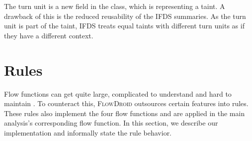 \documentclass[../draft.tex]{subfiles}
\begin{document}


    The turn unit is a new field in the  class, which is representing a taint.
    A drawback of this is the reduced reusability of the IFDS summaries.
    As the turn unit is part of the taint, IFDS treats equal taints with different turn units as if they have a different context.

    \section{Rules}\label{s:rules}
    Flow functions can get quite large, complicated to understand and hard to maintain \cite{Lerch2015}.
    To counteract this, \textsc{FlowDroid} outsources certain features into rules.
    These rules also implement the four flow functions and are applied in the main analysis's corresponding flow function.
    In this section, we describe our implementation and informally state the rule behavior.
\end{document}

